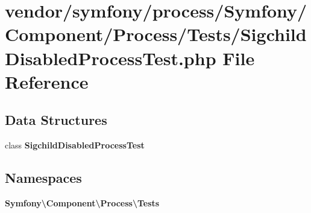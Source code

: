 \section{vendor/symfony/process/\+Symfony/\+Component/\+Process/\+Tests/\+Sigchild\+Disabled\+Process\+Test.php File Reference}
\label{_sigchild_disabled_process_test_8php}
\subsection*{Data Structures}
\begin{DoxyCompactItemize}
\item 
class {\bf Sigchild\+Disabled\+Process\+Test}
\end{DoxyCompactItemize}
\subsection*{Namespaces}
\begin{DoxyCompactItemize}
\item 
 {\bf Symfony\textbackslash{}\+Component\textbackslash{}\+Process\textbackslash{}\+Tests}
\end{DoxyCompactItemize}
